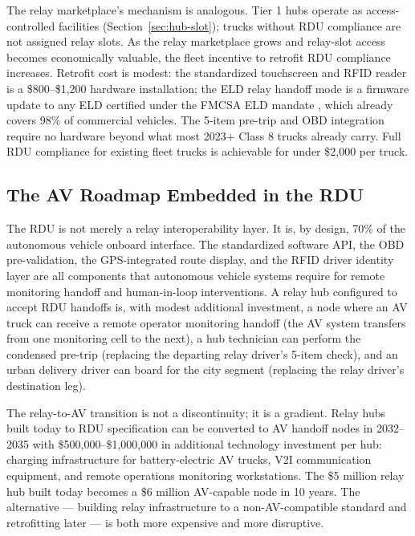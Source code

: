 The relay marketplace's mechanism is analogous. Tier 1 hubs operate as access-controlled facilities (Section~\ref{sec:hub-slot}); trucks without RDU compliance are not assigned relay slots. As the relay marketplace grows and relay-slot access becomes economically valuable, the fleet incentive to retrofit RDU compliance increases. Retrofit cost is modest: the standardized touchscreen and RFID reader is a \$800--\$1,200 hardware installation; the ELD relay handoff mode is a firmware update to any ELD certified under the FMCSA ELD mandate \citep{FMCSA_HOS2022}, which already covers 98\% of commercial vehicles. The 5-item pre-trip and OBD integration require no hardware beyond what most 2023+ Class 8 trucks already carry. Full RDU compliance for existing fleet trucks is achievable for under \$2,000 per truck.

\subsection{The AV Roadmap Embedded in the RDU}

The RDU is not merely a relay interoperability layer. It is, by design, 70\% of the autonomous vehicle onboard interface. The standardized software API, the OBD pre-validation, the GPS-integrated route display, and the RFID driver identity layer are all components that autonomous vehicle systems require for remote monitoring handoff and human-in-loop interventions. A relay hub configured to accept RDU handoffs is, with modest additional investment, a node where an AV truck can receive a remote operator monitoring handoff (the AV system transfers from one monitoring cell to the next), a hub technician can perform the condensed pre-trip (replacing the departing relay driver's 5-item check), and an urban delivery driver can board for the city segment (replacing the relay driver's destination leg).

The relay-to-AV transition is not a discontinuity; it is a gradient. Relay hubs built today to RDU specification can be converted to AV handoff nodes in 2032--2035 with \$500,000--\$1,000,000 in additional technology investment per hub: charging infrastructure for battery-electric AV trucks, V2I communication equipment, and remote operations monitoring workstations. The \$5 million relay hub built today becomes a \$6 million AV-capable node in 10 years. The alternative --- building relay infrastructure to a non-AV-compatible standard and retrofitting later --- is both more expensive and more disruptive.
